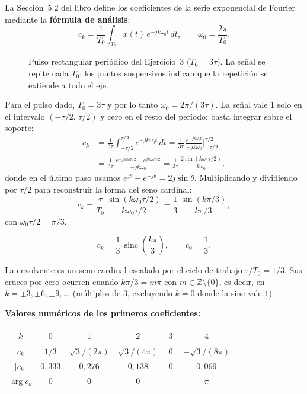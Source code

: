\documentclass[10pt,a4paper]{article}
\begin{document}
	La Sección~5.2 del libro define los coeficientes de la serie exponencial de Fourier mediante la \textbf{fórmula de análisis}:
	\[
		c_k = \frac{1}{T_0}\int_{T_0} x(t)\,e^{-jk\omega_0 t}\,dt,
		\qquad \omega_0 = \frac{2\pi}{T_0}.
	\]

	\begin{figure}[H]
		\centering
		
		\caption{Pulso rectangular periódico del Ejercicio~3 ($T_0 = 3\tau$). La señal se repite cada $T_0$; los puntos suspensivos indican que la repetición se extiende a todo el eje.}
		\label{fig:ej3_senal}
	\end{figure}

	Para el pulso dado, $T_0 = 3\tau$ y por lo tanto $\omega_0 = 2\pi/(3\tau)$. La señal vale $1$ solo en el intervalo $(-\tau/2,\,\tau/2)$ y cero en el resto del período; basta integrar sobre el soporte:
	\begin{align*}
		c_k &= \frac{1}{3\tau}\int_{-\tau/2}^{\tau/2} e^{-jk\omega_0 t}\,dt
		= \frac{1}{3\tau}\,\frac{e^{-jk\omega_0 t}}{-jk\omega_0}\bigg|_{-\tau/2}^{\tau/2} \\
		&= \frac{1}{3\tau}\,\frac{e^{-jk\omega_0\tau/2} - e^{jk\omega_0\tau/2}}{-jk\omega_0}
		= \frac{1}{3\tau}\,\frac{2\sin(k\omega_0\tau/2)}{k\omega_0},
	\end{align*}
	donde en el último paso usamos $e^{j\theta} - e^{-j\theta} = 2j\sin\theta$. Multiplicando y dividiendo por $\tau/2$ para reconstruir la forma del seno cardinal:
	\[
		c_k = \frac{\tau}{T_0}\,\frac{\sin(k\omega_0\tau/2)}{k\omega_0\tau/2}
		= \frac{1}{3}\,\frac{\sin(k\pi/3)}{k\pi/3},
	\]
	con $\omega_0\tau/2 = \pi/3$.

	\[
		\boxed{c_k = \frac{1}{3}\,\operatorname{sinc}\!\left(\frac{k\pi}{3}\right), \qquad c_0 = \frac{1}{3}.}
	\]

	La envolvente es un seno cardinal escalado por el ciclo de trabajo $\tau/T_0 = 1/3$. Sus cruces por cero ocurren cuando $k\pi/3 = m\pi$ con $m \in \mathbb{Z}\setminus\{0\}$, es decir, en $k = \pm 3, \pm 6, \pm 9, \ldots$ (múltiplos de $3$, excluyendo $k = 0$ donde la sinc vale $1$).

	\textbf{Valores numéricos de los primeros coeficientes:}
	\begin{center}
		\begin{tabular}{c|ccccc}
			$k$ & $0$ & $1$ & $2$ & $3$ & $4$ \\ \hline
			$c_k$ & $1/3$ & $\sqrt{3}/(2\pi)$ & $\sqrt{3}/(4\pi)$ & $0$ & $-\sqrt{3}/(8\pi)$ \\
			$|c_k|$ & $0{,}333$ & $0{,}276$ & $0{,}138$ & $0$ & $0{,}069$ \\
			$\arg c_k$ & $0$ & $0$ & $0$ & --- & $\pi$
		\end{tabular}
	\end{center}
\end{document}
